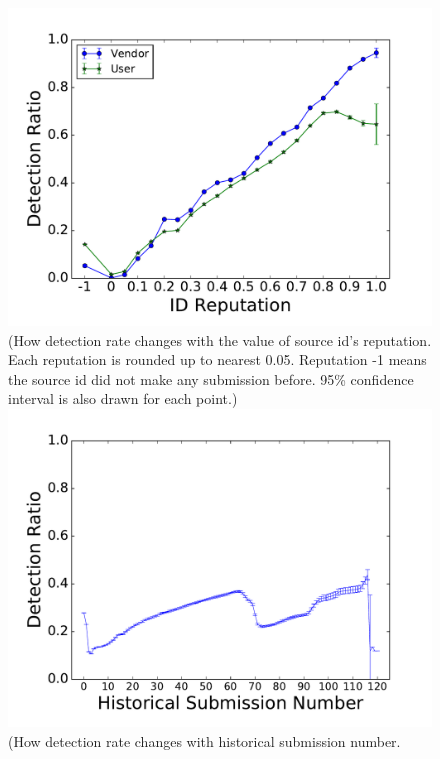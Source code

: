 \begin{figure}[!htb]
  \includegraphics[width=\linewidth]{figure/IDReputation}
{\footnotesize{(How detection rate changes with the value of source id's reputation. Each reputation is rounded up to nearest 0.05.
Reputation -1 means the source id did not make any submission before. 95\% confidence interval is also drawn 
for each point.)}}
\endminipage\hfill
{}
  \includegraphics[width=\linewidth]{figure/SubNum}
  {\footnotesize{(How detection rate changes with historical submission number. 
}}
\end{figure}
